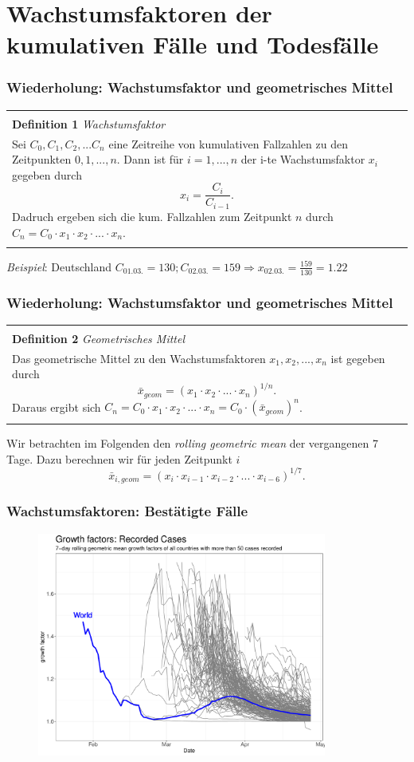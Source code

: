 \documentclass{beamer}
\newenvironment{boxeded}
    {\begin{center}
    \begin{tabular}{|p{0.9\textwidth}|}
    \hline\\
    }
    { 
    \\\\\hline
    \end{tabular} 
    \end{center}
    }
\begin{document}
\section{Wachstumsfaktoren der kumulativen Fälle und Todesfälle}
\begin{frame}
	\frametitle{Wiederholung: Wachstumsfaktor und geometrisches Mittel}
	\begin{boxeded}
		\textbf{Definition 1} \textit{Wachstumsfaktor}\\
		Sei $C_0, C_1, C_2, ... C_n$ eine Zeitreihe von kumulativen Fallzahlen zu den Zeitpunkten $0, 1, ..., n$. Dann ist für $i = 1, ..., n$ der i-te Wachstumsfaktor $x_i$ gegeben durch $$ x_i = \frac{C_i}{C_{i-1}}.$$
		Dadruch ergeben sich die kum. Fallzahlen zum Zeitpunkt $n$ durch $C_n = C_0 \cdot x_1 \cdot x_2 \cdot ... \cdot x_n$.
	\end{boxeded}
	\pause
	\emph{Beispiel}: Deutschland $C_{01.03.} = 130; C_{02.03.}= 159 \Rightarrow x_{02.03.}=\frac{159}{130}=1.22$
\end{frame}

\begin{frame}
	\frametitle{Wiederholung: Wachstumsfaktor und geometrisches Mittel}
	\begin{boxeded}
		\textbf{Definition 2} \textit{Geometrisches Mittel}\\
		Das geometrische Mittel zu den Wachstumsfaktoren $x_1, x_2, ..., x_n$ ist gegeben durch $$\bar{x}_{geom} = (x_1 \cdot x_2 \cdot ... \cdot x_n)^{1/n}.$$ Daraus ergibt sich $C_n = C_0 \cdot x_1 \cdot x_2 \cdot ... \cdot x_n = C_0 \cdot (\bar{x}_{geom})^n$.
	\end{boxeded}
	\pause
	Wir betrachten im Folgenden den \emph{rolling geometric mean} der vergangenen 7 Tage. Dazu berechnen wir für jeden Zeitpunkt $i$ $$\bar{x}_{i, geom} = (x_i \cdot x_{i-1} \cdot x_{i-2} \cdot ... \cdot x_{i-6})^{1/7}.$$
\end{frame}

\begin{frame}
	\frametitle{Wachstumsfaktoren: Bestätigte Fälle}
	\begin{figure}
		\centering
		\includegraphics[width = 270pt]{GF_confirmed}
	\end{figure}
\end{frame}
\end{document}
